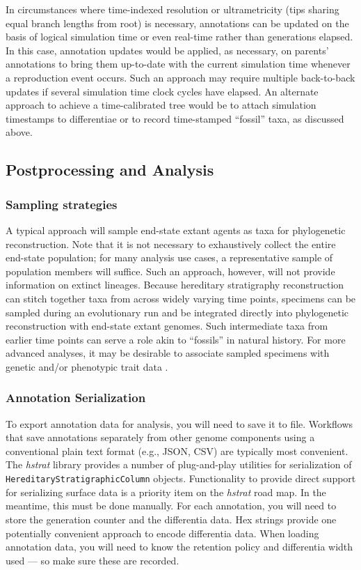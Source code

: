 In circumstances where time-indexed resolution or ultrametricity (tips sharing equal branch lengths from root) is necessary, annotations can be updated on the basis of logical simulation time or even real-time rather than generations elapsed.
In this case, annotation updates would be applied, as necessary, on parents' annotations to bring them up-to-date with the current simulation time whenever a reproduction event occurs.
Such an approach may require multiple back-to-back updates if several simulation time clock cycles have elapsed.
An alternate approach to achieve a time-calibrated tree would be to attach simulation timestamps to differentiae or to record time-stamped ``fossil'' taxa, as discussed above.

\subsection{Postprocessing and Analysis}

\subsubsection{Sampling strategies}

A typical approach will sample end-state extant agents as taxa for phylogenetic reconstruction.
Note that it is not necessary to exhaustively collect the entire end-state population; for many analysis use cases, a representative sample of population members will suffice.
Such an approach, however, will not provide information on extinct lineages.
Because hereditary stratigraphy reconstruction can stitch together taxa from across widely varying time points, specimens can be sampled during an evolutionary run and be integrated directly into phylogenetic reconstruction with end-state extant genomes.
Such intermediate taxa from earlier time points can serve a role akin to ``fossils'' in natural history.
For more advanced analyses, it may be desirable to associate sampled specimens with genetic and/or phenotypic trait data \citep{dolson2019modes,khabbazian2016fast}.

\subsubsection{Annotation Serialization}

To export annotation data for analysis, you will need to save it to file.
Workflows that save annotations separately from other genome components using a conventional plain text format (e.g., JSON, CSV) are typically most convenient.
The \textit{hstrat} library provides a number of plug-and-play utilities for serialization of \texttt{HereditaryStratigraphicColumn} objects.
Functionality to provide direct support for serializing surface data is a priority item on the \textit{hstrat} road map.
In the meantime, this must be done manually.
For each annotation, you will need to store the generation counter and the differentia data.
Hex strings provide one potentially convenient approach to encode differentia data.
When loading annotation data, you will need to know the retention policy and differentia width used --- so make sure these are recorded.

